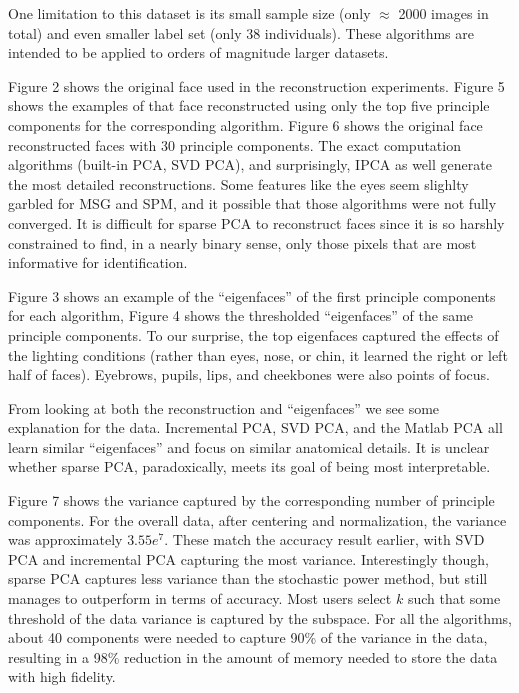 \documentclass[11pt,letterpaper]{article}
\begin{document}
One limitation to this dataset is its small sample size (only $\approx$ 2000 images in total) and even smaller label set (only 38 individuals). These algorithms are intended to be applied to orders of magnitude larger datasets. 

Figure 2 shows the original face used in the reconstruction experiments. Figure 5 shows the examples of that face reconstructed using only the top five principle components for the corresponding algorithm. Figure 6 shows the original face reconstructed faces with 30 principle components. The exact computation algorithms (built-in PCA, SVD PCA), and surprisingly, IPCA as well generate the most detailed reconstructions. Some features like the eyes seem slighlty garbled for MSG and SPM, and it possible that those algorithms were not fully converged. It is difficult for sparse PCA to reconstruct faces since it is so harshly constrained to find, in a nearly binary sense, only those pixels that are most informative for identification.

Figure 3 shows an example of the ``eigenfaces'' of the first principle components for each algorithm, Figure 4 shows the thresholded ``eigenfaces'' of the same principle components.   To our surprise, the top eigenfaces captured the effects of the lighting conditions (rather than eyes, nose, or chin, it learned the right or left half of faces). Eyebrows, pupils, lips, and cheekbones were also points of focus. 


From looking at both the reconstruction and ``eigenfaces'' we see some explanation for the data. Incremental PCA, SVD PCA, and the Matlab PCA all learn similar ``eigenfaces'' and focus on similar anatomical details. It is unclear whether sparse PCA, paradoxically, meets its goal of being most interpretable. 

Figure 7 shows the variance captured by the corresponding number of principle components. For the overall data, after centering and normalization, the variance was approximately $3.55 e^7$. These match the accuracy result earlier, with SVD PCA and incremental PCA capturing the most variance. Interestingly though, sparse PCA captures less variance than the stochastic power method, but still manages to outperform in terms of accuracy. Most users select $k$ such that some threshold of the data variance is captured by the subspace. For all the algorithms, about 40 components were needed to capture 90\% of the variance in the data, resulting in a 98\% reduction in the amount of memory needed to store the data with high fidelity. 
\end{document}
